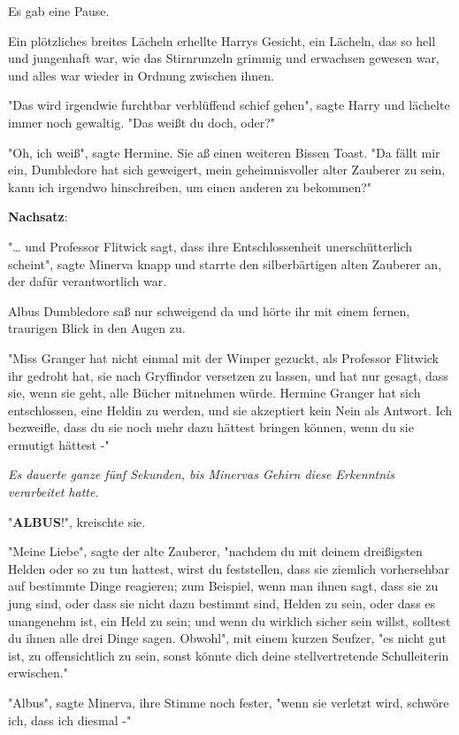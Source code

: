 {Es gab eine Pause.

Ein plötzliches breites Lächeln erhellte Harrys Gesicht, ein Lächeln, das so hell und jungenhaft war, wie das Stirnrunzeln grimmig und erwachsen gewesen war, und alles war wieder in Ordnung zwischen ihnen.

"Das wird irgendwie furchtbar verblüffend schief gehen", sagte Harry und lächelte immer noch gewaltig. "Das weißt du doch, oder?"

"Oh, ich weiß", sagte Hermine. Sie aß einen weiteren Bissen Toast. "Da fällt mir ein, Dumbledore hat sich geweigert, mein geheimnisvoller alter Zauberer zu sein, kann ich irgendwo hinschreiben, um einen anderen zu bekommen?"

\textbf{Nachsatz}:

"… und Professor Flitwick sagt, dass ihre Entschlossenheit unerschütterlich scheint", sagte Minerva knapp und starrte den silberbärtigen alten Zauberer an, der dafür verantwortlich war.

Albus Dumbledore saß nur schweigend da und hörte ihr mit einem fernen, traurigen Blick in den Augen zu.

"Miss Granger hat nicht einmal mit der Wimper gezuckt, als Professor Flitwick ihr gedroht hat, sie nach Gryffindor versetzen zu lassen, und hat nur gesagt, dass sie, wenn sie geht, alle Bücher mitnehmen würde. Hermine Granger hat sich entschlossen, eine Heldin zu werden, und sie akzeptiert kein Nein als Antwort. Ich bezweifle, dass du sie noch mehr dazu hättest bringen können, wenn du sie ermutigt hättest -"

\emph{Es dauerte ganze fünf Sekunden, bis Minervas Gehirn diese Erkenntnis verarbeitet hatte.}

"\textbf{ALBUS}!", kreischte sie.

"Meine Liebe", sagte der alte Zauberer, "nachdem du mit deinem dreißigsten Helden oder so zu tun hattest, wirst du feststellen, dass sie ziemlich vorhersehbar auf bestimmte Dinge reagieren; zum Beispiel, wenn man ihnen sagt, dass sie zu jung sind, oder dass sie nicht dazu bestimmt sind, Helden zu sein, oder dass es unangenehm ist, ein Held zu sein; und wenn du wirklich sicher sein willst, solltest du ihnen alle drei Dinge sagen. Obwohl", mit einem kurzen Seufzer, "es nicht gut ist, zu offensichtlich zu sein, sonst könnte dich deine stellvertretende Schulleiterin erwischen."

"Albus", sagte Minerva, ihre Stimme noch fester, "wenn sie verletzt wird, schwöre ich, dass ich diesmal -"

}

